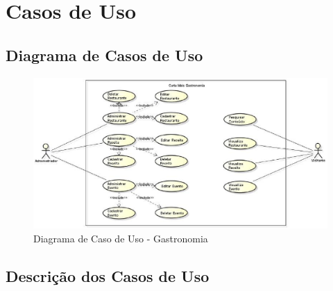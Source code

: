 \chapter[Casos de Uso]{Casos de Uso}

\section{Diagrama de Casos de Uso}

\begin{figure}[H]
	\begin{center}
		\includegraphics[keepaspectratio,scale=0.6]{figuras/diagrama.eps}
		\caption{Diagrama de Caso de Uso - Gastronomia}
	\end{center}
\end{figure}

\section{Descrição dos Casos de Uso}

